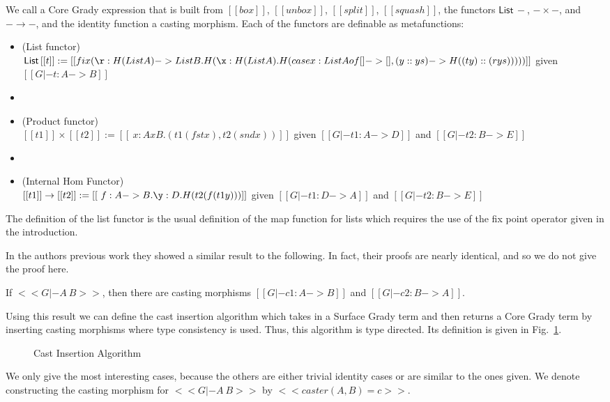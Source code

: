 We call a Core Grady expression that is built from $[[box]]$,
$[[unbox]]$, $[[split]]$, $[[squash]]$, the functors
$\mathsf{List}\,-$, $- \times -$, and $- \to -$, and the identity
function a casting morphism.  Each of the functors are definable as
metafunctions:
\begin{center}\small
  \begin{itemize}
  \item[] (List functor)  \\
    $\mathsf{List}\,[[t]] :=
    [[fix (\r:H(List A) -> List B.H(\x:H(List A).H(case x : List A of [] -> [], (y::ys) -> H((t y) :: (r ys))))) ]]$
    given $[[G |- t : A -> B]]$
  \item[]    
  \item[] (Product functor) \\ 
    $[[t1]] \times [[t2]] := [[\ x : A x B.(t1 (fst x), t2 (snd x))]]$
    given $[[G |- t1 : A -> D]]$ and $[[G |- t2 : B -> E]]$
  \item[]    
  \item[] (Internal Hom Functor) \\  
    $[[t1]] \to [[t2]] := [[\ f : A -> B.\y : D.H(t2 (f (t1 y)))]]$ 
    given $[[G |- t1 : D -> A]]$ and $[[G |- t2 : B -> E]]$
  \end{itemize}
\end{center}
The definition of the list functor is the usual definition of the map
function for lists which requires the use of the fix point operator
given in the introduction.

In the authors previous work \cite{Eades:2017} they showed a similar
result to the following.  In fact, their proofs are nearly identical,
and so we do not give the proof here.
\begin{lemma}
  \label{lemma:casting_morphisms}
  If $<<G |- A ~ B>>$, then there are casting morphisms $[[G |- c1 : A -> B]]$
  and $[[G |- c2 : B -> A]]$.
\end{lemma}
Using this result we can define the cast insertion algorithm which
takes in a Surface Grady term and then returns a Core Grady term by
inserting casting morphisms where type consistency is used.  Thus,
this algorithm is type directed.  Its definition is given in
Fig.~\ref{fig:cast-insert}.
\begin{figure}
  \begin{mdframed}[innertopmargin=60px]
  \end{mdframed}
  \caption{Cast Insertion Algorithm}
  \label{fig:cast-insert}
\end{figure}
We only give the most interesting cases, because the others are either
trivial identity cases or are similar to the ones given.  We denote
constructing the casting morphism for $<<G |- A ~ B>>$ by
$<<caster(A,B) = c>>$.

